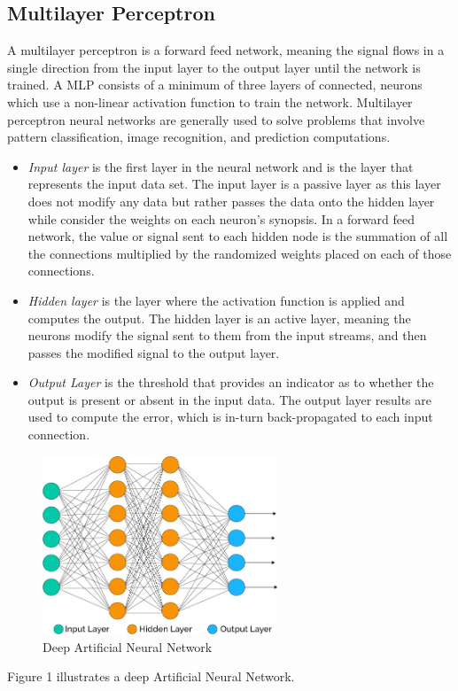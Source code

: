 \documentclass[journal]{IEEEtran}
\begin{document}
\subsection{Multilayer Perceptron}
A multilayer perceptron is a forward feed network, meaning the signal flows in a single direction from the input layer to the output layer until the network is trained.  A MLP consists of a minimum of three layers of connected, neurons which use a non-linear activation function to train the network.  Multilayer perceptron neural networks are generally used to solve problems that involve pattern classification, image recognition, and prediction computations.

\begin{itemize}
    \item \textit{Input layer} is the first layer in the neural network and is the layer that represents the input data set.  The input layer is a passive layer as this layer does not modify any data but rather passes the data onto the hidden layer while consider the weights on each neuron's synopsis.  In a forward feed network, the value or signal sent to each hidden node is the summation of all the connections multiplied by the randomized weights placed on each of those connections.
    \item \textit{Hidden layer} is the layer where the activation function is applied and computes the output.  The hidden layer is an active layer, meaning the neurons modify the signal sent to them from the input streams, and then passes the modified signal to the output layer.
    \item \textit{Output Layer} is the threshold that provides an indicator as to whether the output is present or absent in the input data.  The output layer results are used to compute the error, which is in-turn back-propagated to each input connection.
    
\end{itemize}

\begin{figure}[h]
 \centering
 \includegraphics[width=7cm]{network}
 \caption{Deep Artificial Neural Network}
\end{figure}
Figure 1 illustrates a deep Artificial Neural Network.
\end{document}
